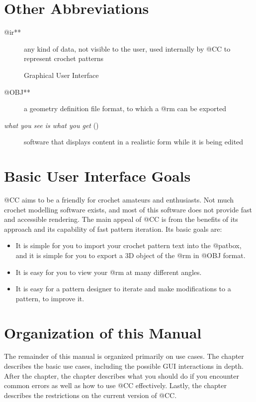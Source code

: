 \documentclass[main.tex]{subfiles}
\begin{document}
\section{Other Abbreviations}

\begin{description}
\item[@ir**] any kind of data, not visible to the user, used internally by @CC to represent crochet patterns
\item[] Graphical User Interface
\item[@OBJ**] a geometry definition file format, to which a @rm can be exported
\item[\emph{what you see is what you get} ()] software that displays content in a realistic form while it is being edited
\end{description}

\section{Basic User Interface Goals}

@CC aims to be a friendly  for crochet amateurs and enthusiasts.
Not much crochet modelling software exists, and most of this software does not provide fast and accessible rendering.
The main appeal of @CC is from the benefits of its  approach and its capability of fast pattern iteration.
Its basic goals are:

\begin{itemize}
\item It is simple for you to import your crochet pattern text into the @patbox, and it is simple for you to export a 3D object of the @rm in @OBJ format.
\item It is easy for you to view your @rm at many different angles.
\item It is easy for a pattern designer to iterate and make modifications to a pattern, to improve it.
\end{itemize}

\section{Organization of this Manual}

The remainder of this manual is organized primarily on use cases.
The  chapter describes the basic use cases, including the possible GUI interactions in depth.
After the  chapter, the  chapter describes what you should do if you encounter common errors as well as how to use @CC effectively.
Lastly, the  chapter describes the restrictions on the current version of @CC.
\end{document}
